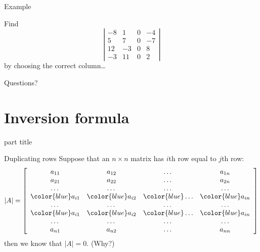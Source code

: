 \documentclass{beamer}
\begin{document}
\begin{frame}{Example}
  \begin{example}
    Find
    \begin{equation*}
      \left|
	\begin{array}{cccc}
          -8&1&0&-4\\
          5&7&0&-7\\
          12&-3&0&8\\
          -3&11&0&2
	\end{array}
      \right|
    \end{equation*}
    by choosing the correct column\dots
  \end{example}
\end{frame}

\begin{frame}
  Questions?
\end{frame}

\section{Inversion formula}

\begin{frame}
  \begin{beamercolorbox}[sep=12pt,center]{part title}
    \insertsection\par
  \end{beamercolorbox}
\end{frame}

\begin{frame}{Duplicating rows}
  Suppose that an $n\times n$ matrix has $i$th row equal to $j$th row:
  \begin{equation*}
    \left|A\right| = \left[
      \begin{array}{cccc}
        a_{11} & a_{12} & \dots & a_{1n}\\
        a_{21} & a_{22} & \dots & a_{2n}\\
        \dots & \dots & \dots & \dots\\
        {\color{blue}a_{i1}} & {\color{blue}a_{i2}} & {\color{blue}\dots} & {\color{blue}a_{in}}\\
        \dots & \dots & \dots & \dots\\
        {\color{blue}a_{i1}} & {\color{blue}a_{i2}} & {\color{blue}\dots}& {\color{blue}a_{in}}\\
        \dots & \dots & \dots & \dots\\
        a_{n1} & a_{n2} & \dots & a_{nn}\\
      \end{array}
    \right]
  \end{equation*}
  then we know that $\left|A\right| = 0$. (Why?)
\end{frame}
\end{document}

